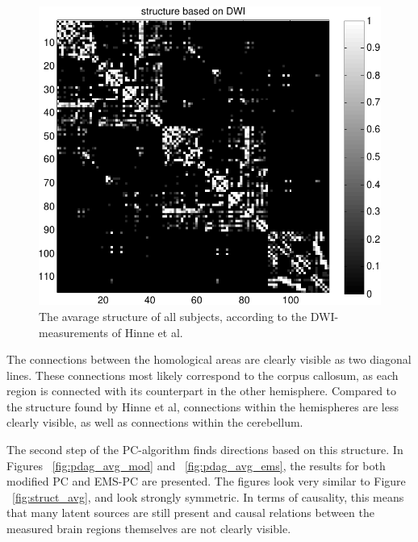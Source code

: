 \documentclass[a4paper, 10pt, english, onecolumn]{article}
\begin{document}
\begin{figure}[h!]
  \centering
  \includegraphics{images/structure_max}
  \caption{The avarage structure of all subjects, according to the DWI-measurements of Hinne et al.}
  \label{fig:struct_max}
\end{figure}


The connections between the homological areas are clearly visible as two diagonal lines.
These connections most likely correspond to the corpus callosum, as each region is connected with its counterpart in the other hemisphere.
Compared to the structure found by Hinne et al, connections within the hemispheres are less clearly visible, as well as connections within the cerebellum.

The second step of the PC-algorithm finds directions based on this structure.
In Figures ~\ref{fig:pdag_avg_mod} and ~\ref{fig:pdag_avg_ems}, the results for both modified PC and EMS-PC are presented.
The figures look very similar to Figure ~\ref{fig:struct_avg}, and look strongly symmetric.
In terms of causality, this means that many latent sources are still present and causal relations between the measured brain regions themselves are not clearly visible.
\end{document}
